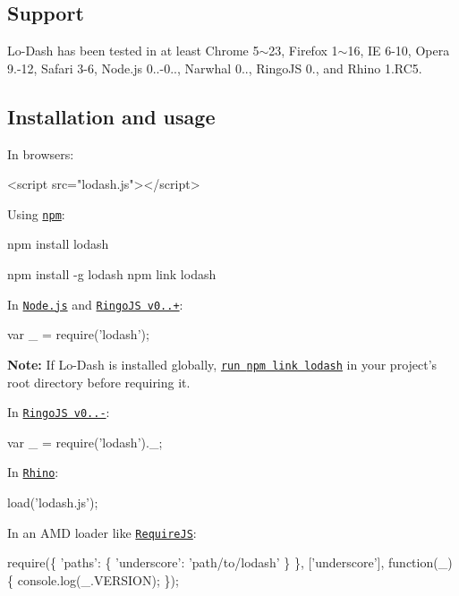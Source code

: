 \subsection*{Support}

Lo-\/\+Dash has been tested in at least Chrome 5$\sim$23, Firefox 1$\sim$16, IE 6-\/10, Opera 9.-\/12, Safari 3-\/6, Node.\+js 0..-\/0.., Narwhal 0.., Ringo\+JS 0., and Rhino 1.\+R\+C5.

\subsection*{Installation and usage}

In browsers\+:


\begin{DoxyCode}
<script src="lodash.js"></script>
\end{DoxyCode}


Using \href{http://npmjs.org/}{\tt npm}\+:


\begin{DoxyCode}
npm install lodash

npm install -g lodash
npm link lodash
\end{DoxyCode}


In \href{http://nodejs.org/}{\tt Node.\+js} and \href{http://ringojs.org/}{\tt Ringo\+JS v0..+}\+:


\begin{DoxyCode}
var \_ = require('lodash');
\end{DoxyCode}


{\bfseries Note\+:} If Lo-\/\+Dash is installed globally, \href{http://blog.nodejs.org/2011/03/23/npm-1-0-global-vs-local-installation/}{\tt run {\ttfamily npm link lodash}} in your project’s root directory before requiring it.

In \href{http://ringojs.org/}{\tt Ringo\+JS v0..-\/}\+:


\begin{DoxyCode}
var \_ = require('lodash').\_;
\end{DoxyCode}


In \href{http://www.mozilla.org/rhino/}{\tt Rhino}\+:


\begin{DoxyCode}
load('lodash.js');
\end{DoxyCode}


In an A\+MD loader like \href{http://requirejs.org/}{\tt Require\+JS}\+:


\begin{DoxyCode}
require(\{
  'paths': \{
    'underscore': 'path/to/lodash'
  \}
\},
['underscore'], function(\_) \{
  console.log(\_.VERSION);
\});
\end{DoxyCode}


